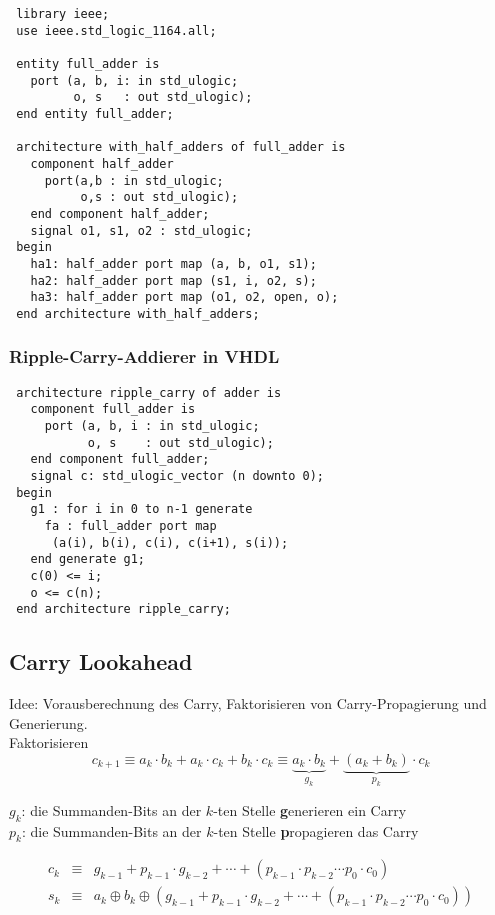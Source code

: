 \documentclass[german, 10pt, a4paper, twocolumn]{scrartcl}
\theoremstyle{definition}
\begin{document}
\begin{verbatim}
 library ieee;
 use ieee.std_logic_1164.all;

 entity full_adder is
   port (a, b, i: in std_ulogic;
         o, s   : out std_ulogic);
 end entity full_adder;

 architecture with_half_adders of full_adder is
   component half_adder
     port(a,b : in std_ulogic;
          o,s : out std_ulogic);
   end component half_adder;
   signal o1, s1, o2 : std_ulogic;
 begin
   ha1: half_adder port map (a, b, o1, s1);
   ha2: half_adder port map (s1, i, o2, s);
   ha3: half_adder port map (o1, o2, open, o);
 end architecture with_half_adders;
\end{verbatim}

\subsubsection{Ripple-Carry-Addierer in VHDL}

\begin{verbatim}
 architecture ripple_carry of adder is
   component full_adder is
     port (a, b, i : in std_ulogic;
           o, s    : out std_ulogic);
   end component full_adder;
   signal c: std_ulogic_vector (n downto 0);
 begin
   g1 : for i in 0 to n-1 generate
     fa : full_adder port map
      (a(i), b(i), c(i), c(i+1), s(i));
   end generate g1;
   c(0) <= i;
   o <= c(n);
 end architecture ripple_carry;
\end{verbatim}

\subsection{Carry Lookahead}

Idee: Vorausberechnung des Carry, Faktorisieren von Carry-Propagierung und Generierung.\\

Faktorisieren
\begin{displaymath}
	c_{k+1} \equiv a_k\cdotp b_k + a_k\cdotp c_k + b_k \cdotp c_k \equiv \underbrace{a_k \cdotp b_k}_{g_k} + \underbrace{(a_k + b_k)}_{p_k} \cdotp c_k
\end{displaymath}

$g_k$: die Summanden-Bits an der $k$-ten Stelle \textbf{g}enerieren ein Carry\\
$p_k$: die Summanden-Bits an der $k$-ten Stelle \textbf{p}ropagieren das Carry

\small
\begin{eqnarray*}
	c_k &	\equiv &	g_{k-1} + p_{k-1}\cdotp g_{k-2}+\cdots+(p_{k-1}\cdotp p_{k-2}\cdots p_0 \cdotp c_0)\\
	s_k &	\equiv &	a_k\oplus b_k\oplus (g_{k-1} + p_{k-1}\cdotp g_{k-2}+\cdots+(p_{k-1}\cdotp p_{k-2}\cdots p_0 \cdotp c_0))
\end{eqnarray*}
\normalsize
\end{document}
